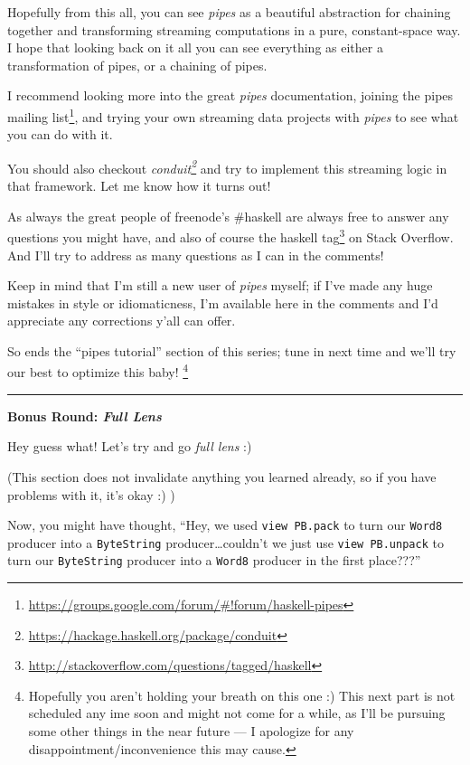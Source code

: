\documentclass[]{article}
\renewcommand{\href}[2]{#2\footnote{\url{#1}}}
\begin{document}
Hopefully from this all, you can see \emph{pipes} as a beautiful
abstraction for chaining together and transforming streaming
computations in a pure, constant-space way. I hope that looking back on
it all you can see everything as either a transformation of pipes, or a
chaining of pipes.

I recommend looking more into the great \emph{pipes} documentation,
joining the
\href{https://groups.google.com/forum/\#!forum/haskell-pipes}{pipes
mailing list}, and trying your own streaming data projects with
\emph{pipes} to see what you can do with it.

You should also checkout
\emph{\href{https://hackage.haskell.org/package/conduit}{conduit}} and
try to implement this streaming logic in that framework. Let me know how
it turns out!

As always the great people of freenode's \#haskell are always free to
answer any questions you might have, and also of course the
\href{http://stackoverflow.com/questions/tagged/haskell}{haskell tag} on
Stack Overflow. And I'll try to address as many questions as I can in
the comments!

Keep in mind that I'm still a new user of \emph{pipes} myself; if I've
made any huge mistakes in style or idiomaticness, I'm available here in
the comments and I'd appreciate any corrections y'all can offer.

So ends the ``pipes tutorial'' section of this series; tune in next time
and we'll try our best to optimize this baby! \footnote{Hopefully you
  aren't holding your breath on this one :) This next part is not
  scheduled any ime soon and might not come for a while, as I'll be
  pursuing some other things in the near future --- I apologize for any
  disappointment/inconvenience this may cause.}

\begin{center}\rule{0.5\linewidth}{\linethickness}\end{center}

\textbf{Bonus Round: \emph{Full Lens}}

Hey guess what! Let's try and go \emph{full lens} :)

(This section does not invalidate anything you learned already, so if
you have problems with it, it's okay :) )

Now, you might have thought, ``Hey, we used \texttt{view\ PB.pack} to
turn our \texttt{Word8} producer into a \texttt{ByteString}
producer\ldots{}couldn't we just use \texttt{view\ PB.unpack} to turn
our \texttt{ByteString} producer into a \texttt{Word8} producer in the
first place???''
\end{document}
